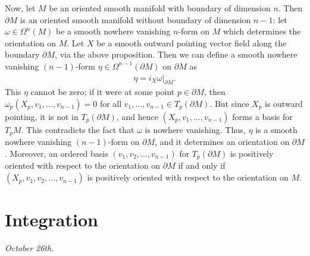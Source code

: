 Now, let $M$ be an oriented smooth manifold with boundary of dimension $n$. Then $\partial M$ is an oriented smooth manifold without boundary of dimension $n-1$: let $\omega \in \Omega^{n}(M)$ be a smooth nowhere vanishing $n$-form on $M$ which determines the orientation on $M$. Let $X$ be a smooth outward pointing vector field along the boundary $\partial M$, via the above proposition. Then we can define a smooth nowhere vanishing $(n-1)$-form $\eta \in \Omega^{n-1}(\partial M)$ on $\partial M$ as
\begin{align}
    \eta = i_{X}\omega|_{\partial M}.
\end{align}
This $\eta$ cannot be zero; if it were at some point $p \in \partial M$, then $\omega_{p}(X_{p},v_{1},\ldots,v_{n-1}) = 0$ for all $v_{1},\ldots,v_{n-1} \in T_{p}(\partial M)$. But since $X_{p}$ is outward pointing, it is not in $T_{p}(\partial M)$, and hence $(X_{p},v_{1},\ldots,v_{n-1})$ forms a basis for $T_{p}M$. This contradicts the fact that $\omega$ is nowhere vanishing. Thus, $\eta$ is a smooth nowhere vanishing $(n-1)$-form on $\partial M$, and it determines an orientation on $\partial M$. Moreover, an ordered basis $(v_{1},v_{2},\ldots,v_{n-1})$ for $T_{p}(\partial M)$ is positively oriented with respect to the orientation on $\partial M$ if and only if $(X_{p},v_{1},v_{2},\ldots,v_{n-1})$ is positively oriented with respect to the orientation on $M$.

\section{Integration}
\textit{October 26th.}


